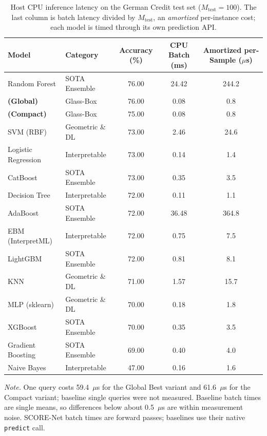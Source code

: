 \begin{table}[!t]
\centering
\caption{Host CPU inference latency on the German Credit test set ($M_{\text{test}} = 100$). The last column is batch latency divided by $M_{\text{test}}$, an \emph{amortized} per-instance cost; each model is timed through its own prediction API.}
\label{tab:cpu_latency_baselines}
\footnotesize
\renewcommand{\arraystretch}{0.85}
\setlength{\tabcolsep}{4pt}
\begin{tabular}{llccc}
\toprule
\textbf{Model} & \textbf{Category} & \textbf{Accuracy (\%)} & \textbf{CPU Batch (ms)} & \textbf{Amortized per-Sample ($\mu$s)} \\
\midrule
Random Forest & SOTA Ensemble & 76.00 & 24.42 & 244.2 \\
\textbf{\modelname{} (Global)} & Glass-Box & 76.00 & 0.08 & 0.8 \\
\textbf{\modelname{} (Compact)} & Glass-Box & 75.00 & 0.08 & 0.8 \\
SVM (RBF) & Geometric \& DL & 73.00 & 2.46 & 24.6 \\
Logistic Regression & Interpretable & 73.00 & 0.14 & 1.4 \\
CatBoost & SOTA Ensemble & 73.00 & 0.35 & 3.5 \\
Decision Tree & Interpretable & 72.00 & 0.11 & 1.1 \\
AdaBoost & SOTA Ensemble & 72.00 & 36.48 & 364.8 \\
EBM (InterpretML) & Interpretable & 72.00 & 0.75 & 7.5 \\
LightGBM & SOTA Ensemble & 72.00 & 0.81 & 8.1 \\
KNN & Geometric \& DL & 71.00 & 1.57 & 15.7 \\
MLP (sklearn) & Geometric \& DL & 70.00 & 0.18 & 1.8 \\
XGBoost & SOTA Ensemble & 70.00 & 0.35 & 3.5 \\
Gradient Boosting & SOTA Ensemble & 69.00 & 0.40 & 4.0 \\
Naive Bayes & Interpretable & 47.00 & 0.16 & 1.6 \\
\bottomrule
\end{tabular}
\par\smallskip
\footnotesize\emph{Note.} One query costs 59.4~$\mu$s for the Global Best variant and 61.6~$\mu$s for the Compact variant; baseline single queries were not measured. Baseline batch times are single means, so differences below about 0.5~$\mu$s are within measurement noise. SCORE-Net batch times are forward passes; baselines use their native \texttt{predict} call.
\end{table}
